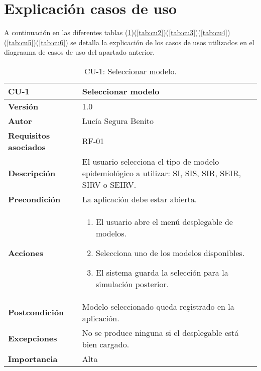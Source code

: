 \section{Explicación casos de uso}
A continuación en las diferentes tablas (\ref{tab:cu1})(\ref{tab:cu2})(\ref{tab:cu3})(\ref{tab:cu4})(\ref{tab:cu5})(\ref{tab:cu6}) se detalla la explicación de los casos de usos utilizados en el diagraama de casos de uso del apartado anterior.
\begin{table}[H]
\centering
\begin{tabular}{|p{3cm}|p{9cm}|}
\hline
\textbf{CU-1} & \textbf{Seleccionar modelo} \\
\hline
\textbf{Versión} & 1.0 \\
\hline
\textbf{Autor} & Lucía Segura Benito \\
\hline
\textbf{Requisitos asociados} & RF-01 \\
\hline
\textbf{Descripción} & El usuario selecciona el tipo de modelo epidemiológico a utilizar: SI, SIS, SIR, SEIR, SIRV o SEIRV. \\
\hline
\textbf{Precondición} & La aplicación debe estar abierta. \\
\hline
\textbf{Acciones} &
\begin{enumerate}
    \item El usuario abre el menú desplegable de modelos.
    \item Selecciona uno de los modelos disponibles.
    \item El sistema guarda la selección para la simulación posterior.
\end{enumerate}
\\
\hline
\textbf{Postcondición} & Modelo seleccionado queda registrado en la aplicación. \\
\hline
\textbf{Excepciones} & No se produce ninguna si el desplegable está bien cargado. \\
\hline
\textbf{Importancia} & Alta \\
\hline
\end{tabular}
\caption{CU-1: Seleccionar modelo.}
\label{tab:cu1}
\end{table}



